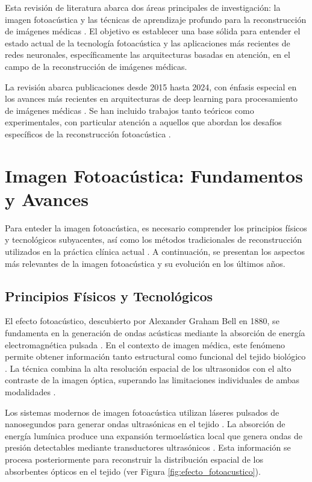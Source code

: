 Esta revisión de literatura abarca dos áreas principales de investigación: la imagen fotoacústica y las técnicas de aprendizaje profundo para la reconstrucción de imágenes médicas \cite{valluru2016molecular}. El objetivo es establecer una base sólida para entender el estado actual de la tecnología fotoacústica y las aplicaciones más recientes de redes neuronales, específicamente las arquitecturas basadas en atención, en el campo de la reconstrucción de imágenes médicas.

La revisión abarca publicaciones desde 2015 hasta 2024, con énfasis especial en los avances más recientes en arquitecturas de deep learning para procesamiento de imágenes médicas \cite{shen2017deep}. Se han incluido trabajos tanto teóricos como experimentales, con particular atención a aquellos que abordan los desafíos específicos de la reconstrucción fotoacústica \cite{antholzer2019deep}.
\section{Imagen Fotoacústica: Fundamentos y Avances} \label{sec:lit:first}

Para enteder la imagen fotoacústica, es necesario comprender los principios físicos y tecnológicos subyacentes, así como los métodos tradicionales de reconstrucción utilizados en la práctica clínica actual \cite{wang2012photoacoustic}. A continuación, se presentan los aspectos más relevantes de la imagen fotoacústica y su evolución en los últimos años.

\subsection{Principios Físicos y Tecnológicos} \label{sec:lit:first:one}
El efecto fotoacústico, descubierto por Alexander Graham Bell en 1880, se fundamenta en la generación de ondas acústicas mediante la absorción de energía electromagnética pulsada \cite{bell1880production}. En el contexto de imagen médica, este fenómeno permite obtener información tanto estructural como funcional del tejido biológico \cite{xu2006photoacoustic}. La técnica combina la alta resolución espacial de los ultrasonidos con el alto contraste de la imagen óptica, superando las limitaciones individuales de ambas modalidades \cite{wang2012photoacoustic}.

Los sistemas modernos de imagen fotoacústica utilizan láseres pulsados de nanosegundos para generar ondas ultrasónicas en el tejido \cite{li2021photoacoustic}. La absorción de energía lumínica produce una expansión termoelástica local que genera ondas de presión detectables mediante transductores ultrasónicos \cite{wang2016review}. Esta información se procesa posteriormente para reconstruir la distribución espacial de los absorbentes ópticos en el tejido (ver Figura \ref{fig:efecto_fotoacustico}).

